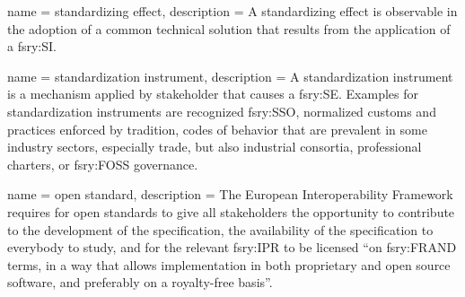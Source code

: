  { name = {standardizing effect}, description = {
    A standardizing effect is observable in the adoption of a common
    technical solution that results from the application of a
    \gls{fsry:SI}.} }

 { name = {standardization instrument},
  description = { A standardization instrument is a mechanism applied
    by stakeholder that causes a \gls{fsry:SE}. Examples for
    standardization instruments are recognized \gls{fsry:SSO}, normalized
    customs and practices enforced by tradition, codes of behavior
    that are prevalent in some industry sectors, especially trade, but
    also industrial consortia, professional charters, or \gls{fsry:FOSS}
    governance.} }

 { name = {open standard}, description = {
    The European Interoperability Framework requires for open
    standards to give all stakeholders the opportunity to contribute
    to the development of the specification, the availability of the
    specification to everybody to study, and for the relevant
    \gls{fsry:IPR} to be licensed ``on \gls{fsry:FRAND} terms, in a way that
    allows implementation in both proprietary and open source
    software, and preferably on a royalty-free
    basis''.\cite{fsry:ec-sep-2018} } }
